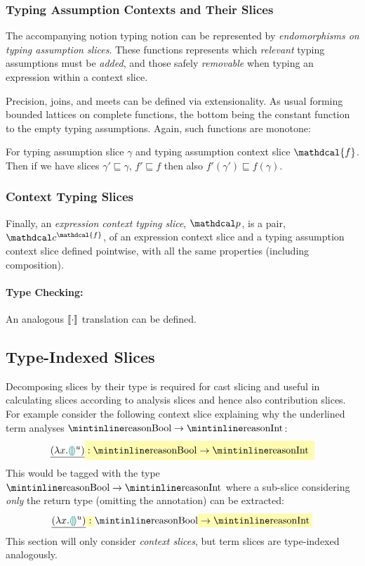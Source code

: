\subsubsection{Typing Assumption Contexts and Their Slices}
The accompanying notion typing notion can be represented by \textit{endomorphisms on typing assumption slices}. These functions represents which \textit{relevant} typing assumptions must be \textit{added}, and those safely \textit{removable} when typing an expression within a context slice.

\renewcommand{\F}{\mathdcal{F}}
\newcommand{\f}{\mathdcal{f}}

Precision, joins, and meets can be defined via extensionality. As usual forming bounded lattices on complete functions, the bottom being the constant function to the empty typing assumptions. Again, such functions are monotone:
\begin{proposition}
For typing assumption slice $\gamma$ and typing assumption context slice $\f$. Then if we have slices $\gamma' \sqsubseteq \gamma$, $f' \sqsubseteq f$ then also $f'(\gamma') \sqsubseteq f(\gamma)$.
\end{proposition}
\subsubsection{Context Typing Slices}
Finally, an \textit{expression context typing slice}, $\p$, is a pair, $\Cs^\f$, of an expression context slice and a typing assumption context slice defined pointwise, with all the same properties (including composition).

\paragraph{Type Checking: } An analogous $\llbracket \cdot \rrbracket$ translation can be defined.

\subsection{Type-Indexed Slices}\label{sec:TypeIndexedSlices}
Decomposing slices by their type is required for cast slicing and useful in calculating slices according to analysis slices and hence also contribution slices. For example consider the following context slice explaining why the underlined term analyses $\code{Bool} \to \code{Int}$:
\[\underline{(\lambda x. \hole^u )} \hlcmaths[yellow!30]{:  \code{Bool} \hlcmaths[yellow!30]{\to \code{Int}}}\]
This would be tagged with the type $\code{Bool} \to \code{Int}$ where a sub-slice considering \textit{only} the  return type (omitting the  annotation) can be extracted:
\[\underline{(\lambda x. \hole^u )} \hlcmaths[yellow!30]{:}  \code{Bool} \hlcmaths[yellow!30]{\to \code{Int}}\]
This section will only consider \textit{context slices}, but term slices are type-indexed analogously.

